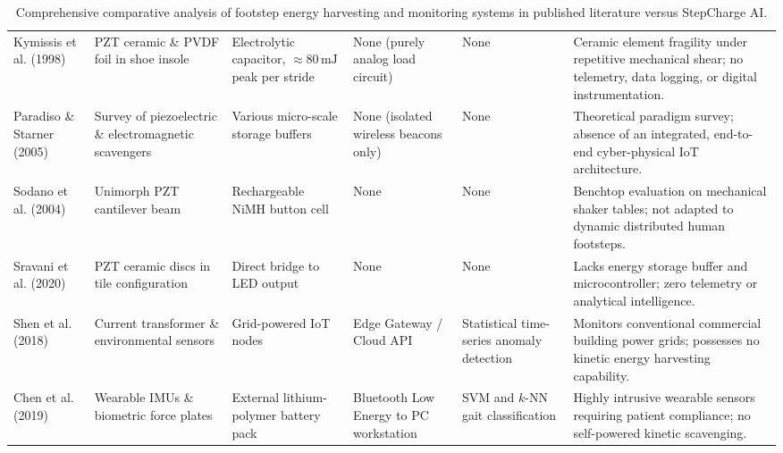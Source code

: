 \begin{landscape}
\begin{table}[p]
\centering
\small
\renewcommand{\arraystretch}{1.25}
\caption{Comprehensive comparative analysis of footstep energy harvesting and monitoring systems in published literature versus StepCharge AI.}
\label{tab:literature_comparison}
\begin{tabularx}{\linewidth}{@{} L{1.3in} L{1.2in} L{1.3in} L{1.3in} L{1.4in} Y @{}}
\toprule
{}
 &  &  &  &  &  \\
\midrule
{}
Kymissis et al. (1998)~\cite{kymissis1998parasitic} & PZT ceramic \& PVDF foil in shoe insole & Electrolytic capacitor, $\approx 80\,\text{mJ}$ peak per stride & None (purely analog load circuit) & None & Ceramic element fragility under repetitive mechanical shear; no telemetry, data logging, or digital instrumentation. \\
Paradiso \& Starner (2005)~\cite{paradiso2005energy} & Survey of piezoelectric \& electromagnetic scavengers & Various micro-scale storage buffers & None (isolated wireless beacons only) & None & Theoretical paradigm survey; absence of an integrated, end-to-end cyber-physical IoT architecture. \\
Sodano et al. (2004)~\cite{sodano2004estimation} & Unimorph PZT cantilever beam & Rechargeable NiMH button cell & None & None & Benchtop evaluation on mechanical shaker tables; not adapted to dynamic distributed human footsteps. \\
Sravani et al. (2020)~\cite{sravani2020piezoelectric} & PZT ceramic discs in tile configuration & Direct bridge to LED output & None & None & Lacks energy storage buffer and microcontroller; zero telemetry or analytical intelligence. \\
Shen et al. (2018)~\cite{shen2018iot} & Current transformer \& environmental sensors & Grid-powered IoT nodes & Edge Gateway / Cloud API & Statistical time-series anomaly detection & Monitors conventional commercial building power grids; possesses no kinetic energy harvesting capability. \\
Chen et al. (2019)~\cite{chen2019gait} & Wearable IMUs \& biometric force plates & External lithium-polymer battery pack & Bluetooth Low Energy to PC workstation & SVM and $k$-NN gait classification & Highly intrusive wearable sensors requiring patient compliance; no self-powered kinetic scavenging. \\

\end{tabularx}
\end{table}
\end{landscape}

